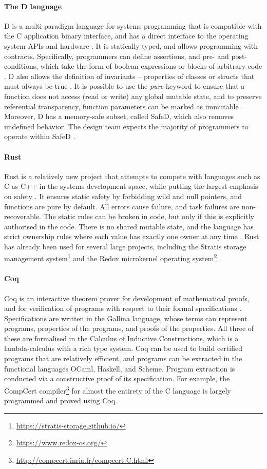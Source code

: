 \paragraph{The D language}
D is a multi-paradigm language for systems programming that is compatible with the C application binary interface, and has a direct interface to the operating system APIs and hardware \cite{dlangTour}.
It is statically typed, and allows programming with contracts.
Specifically, programmers can define assertions, and pre- and post-conditions, which take the form of boolean expressions or blocks of arbitrary code \cite{dlangContracts}.
D also allows the definition of invariants -- properties of classes or structs that must always be true \cite{dlangContracts}.
It is possible to use the \textit{pure} keyword to ensure that a function does not access (read or write) any global mutable state, and to preserve referential transparency, function parameters can be marked as immutable \cite{nadlinger2012}.
Moreover, D has a memory-safe subset, called SafeD, which also removes undefined behavior.
The design team expects the majority of programmers to operate within SafeD \cite{milewski}.

\paragraph{Rust}
Rust is a relatively new project that attempts to compete with languages such as C as C++ in the systems development space, while putting the largest emphasis on safety \cite{hoare2010}.
It ensures static safety by forbidding wild and null pointers, and functions are pure by default.
All errors cause failure, and task failures are non-recoverable.
The static rules can be broken in code, but only if this is explicitly authorised in the code.
There is no shared mutable state, and the language has strict ownership rules where each value has exactly one owner at any time \cite{klabnik2019}.
Rust has already been used for several large projects, including the Stratis storage management system\footnote{\url{https://stratis-storage.github.io/}} and the Redox microkernel operating system\footnote{\url{https://www.redox-os.org/}}.

\paragraph{Coq}
Coq is an interactive theorem prover for development of mathematical proofs, and for verification of programs with respect to their formal specifications \cite{coqRM}.
Specifications are written in the Gallina language, whose terms can represent programs, properties of the programs, and proofs of the properties.
All three of these are formalised in the Calculus of Inductive Constructions, which is a lambda-calculus with a rich type system.
Coq can be used to build certified programs that are relatively efficient, and programs can be extracted in the functional languages OCaml, Haskell, and Scheme.
Program extraction is conducted via a constructive proof of its specification.
For example, the CompCert compiler\footnote{\url{http://compcert.inria.fr/compcert-C.html}} for almost the entirety of the C language is largely programmed and proved using Coq.

